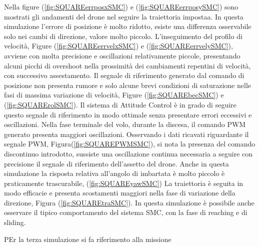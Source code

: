Nella figure (\ref{fig:SQUAREerrposxSMC}) e (\ref{fig:SQUAREerrposySMC}) sono mostrati gli andamenti del drone nel seguire la traiettoria impostaa. In questa simulazione l'errore di posizione è molto ridotto, esiste una differenza osservabile solo nei cambi di direzione, valore molto piccolo. L'inseguimento del profilo di velocità, Figure (\ref{fig:SQUAREerrvelxSMC}) e (\ref{fig:SQUAREerrvelySMC}), avviene con molta precisione e oscillazioni relativamente piccole, presentando alcuni picchi di overshoot nella prossimità dei cambiamenti repentini di velocità, con successivo assestamento. Il segnale di riferimento generato dal comando di posizione non presenta rumore e solo alcune brevi condizioni di saturazione nelle fasi di massima variazione di velocità, Figure (\ref{fig:SQUAREbecSMC}) e (\ref{fig:SQUARErolSMC}). Il sistema di Attitude Control è in grado di seguire questo segnale di riferimento in modo ottimale senza presentare errori eccessivi e oscillazioni. Nella fase terminale del volo, durante la discesa, il comando PWM generato presenta maggiori oscillazioni. Osservando i dati ricavati riguardante il segnale PWM, Figura(\ref{fig:SQUAREPWMSMC}), si nota la presenza del comando discontinuo introdotto, sussiste una oscillazione continua necessaria a seguire con precisione il segnale di riferimento dell'assetto del drone. Anche in questa simulazione la risposta relativa all'angolo di imbartata è molto piccolo è praticamente trascurabile, (\ref{fig:SQUAREyawSMC}) La traiettoria è seguita in modo efficacie e presenta scostamenti maggiori nella fase di variazione della direzione, Figura (\ref{fig:SQUAREtraSMC}). In questa simulazione è possibile anche osservare il tipico comportamento del sistema SMC, con la fase di reaching e di sliding.

PEr la terza simulazione si fa riferimento alla missione

